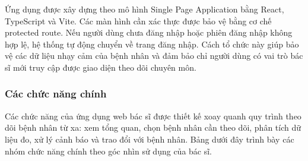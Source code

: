 \par Ứng dụng được xây dựng theo mô hình Single Page Application bằng React, TypeScript và Vite. Các màn hình cần xác thực được bảo vệ bằng cơ chế protected route. Nếu người dùng chưa đăng nhập hoặc phiên đăng nhập không hợp lệ, hệ thống tự động chuyển về trang đăng nhập. Cách tổ chức này giúp bảo vệ các dữ liệu nhạy cảm của bệnh nhân và đảm bảo chỉ người dùng có vai trò bác sĩ mới truy cập được giao diện theo dõi chuyên môn.


\subsubsection{Các chức năng chính}
\par Các chức năng của ứng dụng web bác sĩ được thiết kế xoay quanh quy trình theo dõi bệnh nhân từ xa: xem tổng quan, chọn bệnh nhân cần theo dõi, phân tích dữ liệu đo, xử lý cảnh báo và trao đổi với bệnh nhân. Bảng dưới đây trình bày các nhóm chức năng chính theo góc nhìn sử dụng của bác sĩ.

